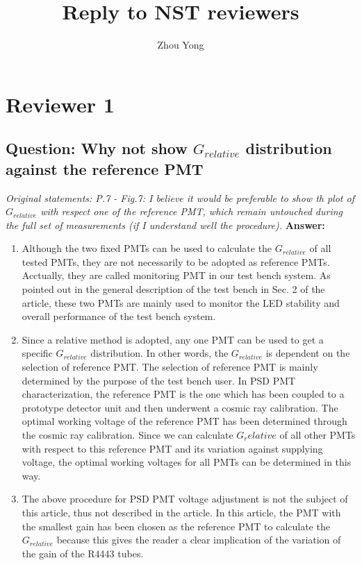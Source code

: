 \documentclass[]{article}
\title{Reply to NST reviewers}
\author{Zhou Yong}
\begin{document}
\maketitle

\section{Reviewer 1}
\subsection{Question: Why not show $G_{relative}$ distribution against the reference PMT}
\textit{Original statements: P.7 - Fig.7: I believe it would be preferable to show th plot of $G_{relative}$ with respect one of the reference PMT, which remain untouched during the full set of measurements (if I understand well the procedure).} \newline
\textbf{Answer:}
\begin{enumerate}
	\item Although the two fixed PMTs can be used to calculate the $G_{relative}$ of all tested PMTs, they are not necessarily to be adopted as reference PMTs.  Acctually, they are called monitoring PMT  in our test bench system. As pointed out in the general description of the test bench in Sec. 2 of the article, these two PMTs are mainly used to monitor the LED stability and overall performance of the test bench system. 
	\item Since a relative method is adopted, any one PMT can be used to get a specific $G_{relative}$ distribution. In other words, the $G_{relative}$ is dependent on the selection of reference PMT. The selection of reference PMT is mainly determined by the purpose of the test bench user. In PSD PMT characterization, the reference  PMT is the one which has been coupled to a prototype detector unit and then underwent a cosmic ray calibration. The optimal working voltage of the reference PMT has been determined through the cosmic ray calibration. Since we can calculate $G_relative$ of all other PMTs with respect to this reference PMT and its variation against supplying voltage, the optimal working voltages for all PMTs can be determined in this way.  
	\item The above procedure for  PSD PMT voltage adjustment is not the subject of this article, thus not described in the article. In this article, the PMT with the smallest gain has been chosen as the reference PMT to calculate the $G_{relative}$ because this gives the reader a clear implication of the variation of the gain of the R4443 tubes.
\end{enumerate}
\end{document}
